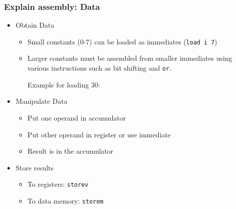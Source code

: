 	\begin{frame}
		\frametitle{Explain assembly: Data}

		\begin{itemize}
			\item Obtain Data
				\begin{itemize}
					\item Small constants (0-7) can be loaded as immediates (\texttt{load i 7})
					\item Larger constants must be assembled from smaller immediates using various instructions such as bit shifting and \texttt{or}.

						Example for loading $30$:
						\begin{quote}
						\end{quote}
				\end{itemize}
			\item Manipulate Data
				\begin{itemize}
					\item Put one operand in accumulator
					\item Put other operand in register or use immediate
					\item Result is in the accumulator
				\end{itemize}
			\item Store results
				\begin{itemize}
					\item To registers: \texttt{storev}
					\item To data memory: \texttt{storem}
				\end{itemize}
		\end{itemize}
	\end{frame}


